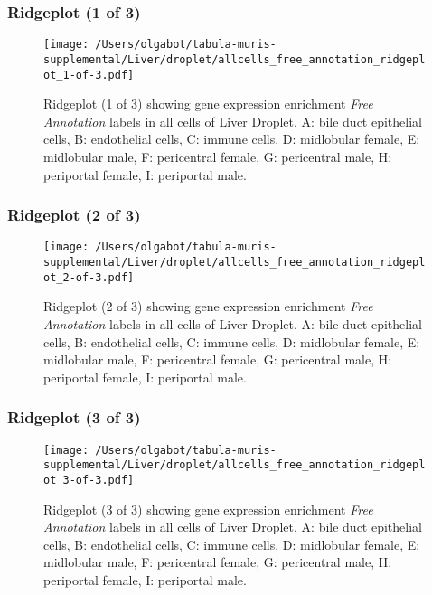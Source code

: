\clearpage

\subsubsection{Ridgeplot (1 of 3)}
\begin{figure}[h]
\centering
\texttt{[image: /Users/olgabot/tabula-muris-supplemental/Liver/droplet/allcells\_free\_annotation\_ridgeplot\_1-of-3.pdf]}

\caption{ Ridgeplot (1 of 3)  showing gene expression enrichment \emph{Free Annotation} labels in all cells of Liver Droplet. A: bile duct epithelial cells, B: endothelial cells, C: immune cells, D: midlobular female, E: midlobular male, F: pericentral female, G: pericentral male, H: periportal female, I: periportal male.}
\end{figure}


\clearpage

\subsubsection{Ridgeplot (2 of 3)}
\begin{figure}[h]
\centering
\texttt{[image: /Users/olgabot/tabula-muris-supplemental/Liver/droplet/allcells\_free\_annotation\_ridgeplot\_2-of-3.pdf]}

\caption{ Ridgeplot (2 of 3)  showing gene expression enrichment \emph{Free Annotation} labels in all cells of Liver Droplet. A: bile duct epithelial cells, B: endothelial cells, C: immune cells, D: midlobular female, E: midlobular male, F: pericentral female, G: pericentral male, H: periportal female, I: periportal male.}
\end{figure}


\clearpage

\subsubsection{Ridgeplot (3 of 3)}
\begin{figure}[h]
\centering
\texttt{[image: /Users/olgabot/tabula-muris-supplemental/Liver/droplet/allcells\_free\_annotation\_ridgeplot\_3-of-3.pdf]}

\caption{ Ridgeplot (3 of 3)  showing gene expression enrichment \emph{Free Annotation} labels in all cells of Liver Droplet. A: bile duct epithelial cells, B: endothelial cells, C: immune cells, D: midlobular female, E: midlobular male, F: pericentral female, G: pericentral male, H: periportal female, I: periportal male.}
\end{figure}


